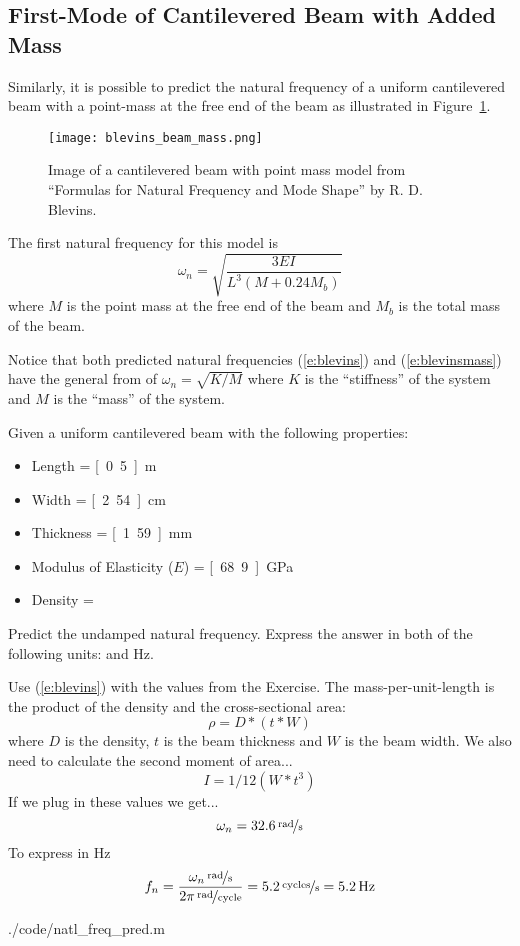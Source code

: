 \subsection{First-Mode of Cantilevered Beam with Added Mass}
Similarly, it is possible to predict the natural frequency of a uniform cantilevered beam with a point-mass at the free end of the beam as illustrated in Figure~\ref{f:blevinsmass}.
\begin{figure}[htb!]
\centerline{
{\texttt{[image: blevins\_beam\_mass.png]}}}
\caption{Image of a cantilevered beam with point mass model from ``Formulas for Natural Frequency and Mode Shape'' by R. D. Blevins.}
\label{f:blevinsmass}
\end{figure}
The first natural frequency for this model is
\begin{equation}\label{e:blevinsmass}
\omega_n = \sqrt{ \frac{3 E I}{L^3 (M+0.24 M_b)}}
\end{equation}
where $M$ is the point mass at the free end of the beam and $M_b$ is the total mass of the beam.

Notice that both predicted natural frequencies (\ref{e:blevins}) and (\ref{e:blevinsmass}) have the general from of $\omega_n = \sqrt{K/M}$ where $K$ is the ``stiffness'' of the system and $M$ is the ``mass'' of the system.


\begin{ex}\label{ex:beamvib}
Given a uniform cantilevered beam with the following properties:
\begin{itemize}
\item Length = \unit[0.5]{m}
\item Width = \unit[2.54]{cm}
\item Thickness = \unit[1.59]{mm}
\item Modulus of Elasticity ($E$) = \unit[68.9]{GPa}
\item Density = 
\end{itemize}
Predict the undamped natural frequency.  Express the answer in both of the following units:  and \unit[]{Hz}.
\end{ex}

\ifsolutions
\begin{soln}
Use (\ref{e:blevins}) with the values from the Exercise.  The mass-per-unit-length is the product of the density and the cross-sectional area:
\[ \rho = D*(t*W) \]
where $D$ is the density, $t$ is the beam thickness and $W$ is the beam width.
We also need to calculate the second moment of area...
\[ I = 1/12(W*t^3) \]
If we plug in these values we get...
\[ \omega_n = \unitfrac[32.6]{rad}{s} \]
To express in Hz
\[ f_n = \frac{\unitfrac[\omega_n]{rad}{s}}{\unitfrac[2\pi]{rad}{cycle}} = \unitfrac[5.2]{cycles}{s}=\unit[5.2]{Hz}
\]


{./code/natl_freq_pred.m}

\end{soln}
\fi

